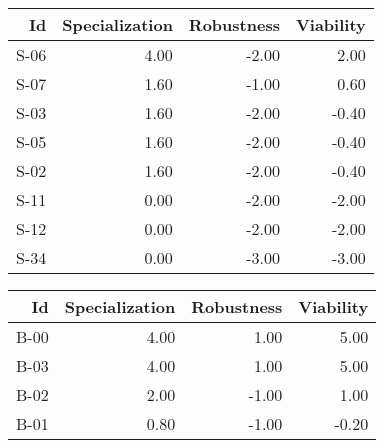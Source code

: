 


\begin{tabular}{ | r | r | r | r | }
    \hline
                    Id  &  Specialization  &      Robustness  &       Viability  \\
    \hline
    \hline
                  S-06  &            4.00  &           -2.00  &            2.00  \\
    \hline
                  S-07  &            1.60  &           -1.00  &            0.60  \\
    \hline
                  S-03  &            1.60  &           -2.00  &           -0.40  \\
    \hline
                  S-05  &            1.60  &           -2.00  &           -0.40  \\
    \hline
                  S-02  &            1.60  &           -2.00  &           -0.40  \\
    \hline
                  S-11  &            0.00  &           -2.00  &           -2.00  \\
    \hline
                  S-12  &            0.00  &           -2.00  &           -2.00  \\
    \hline
                  S-34  &            0.00  &           -3.00  &           -3.00  \\
    \hline
\end{tabular}


\begin{tabular}{ | r | r | r | r | }
    \hline
                    Id  &  Specialization  &      Robustness  &       Viability  \\
    \hline
    \hline
                  B-00  &            4.00  &            1.00  &            5.00  \\
    \hline
                  B-03  &            4.00  &            1.00  &            5.00  \\
    \hline
                  B-02  &            2.00  &           -1.00  &            1.00  \\
    \hline
                  B-01  &            0.80  &           -1.00  &           -0.20  \\
    \hline
\end{tabular}


